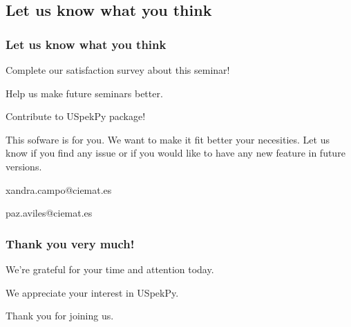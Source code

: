 \documentclass{beamer}
\newcommand{\highlight}[1]{{\color{blue} #1}}
\begin{document}
	\subsection{Let us know what you think}
	
	\begin{frame}
		\frametitle{Let us know what you think}
		\centering
		\highlight{Complete our satisfaction survey about this seminar!}
		
		Help us make future seminars better.
		
		\bigskip
		
		\href{https://forms.gle/zymzqsLidy5uxKQV6}{}
		
		\bigskip
		
		\highlight{Contribute to USpekPy package!}
		
		This sofware is for you. We want to make it fit better your necesities. Let us know if you find any issue or if you would like to have any new feature in future versions.
		
		\bigskip
		
		\href{https://github.com/lmri-met/uspekpy/issues}{}
		
		xandra.campo@ciemat.es
		
		paz.aviles@ciemat.es
	\end{frame}
	
	\begin{frame}
		\frametitle{Thank you very much!}
		\centering
		We’re grateful for your time and attention today. 
		
		We appreciate your interest in USpekPy.
		
		Thank you for joining us.
	\end{frame}
	
\end{document}
